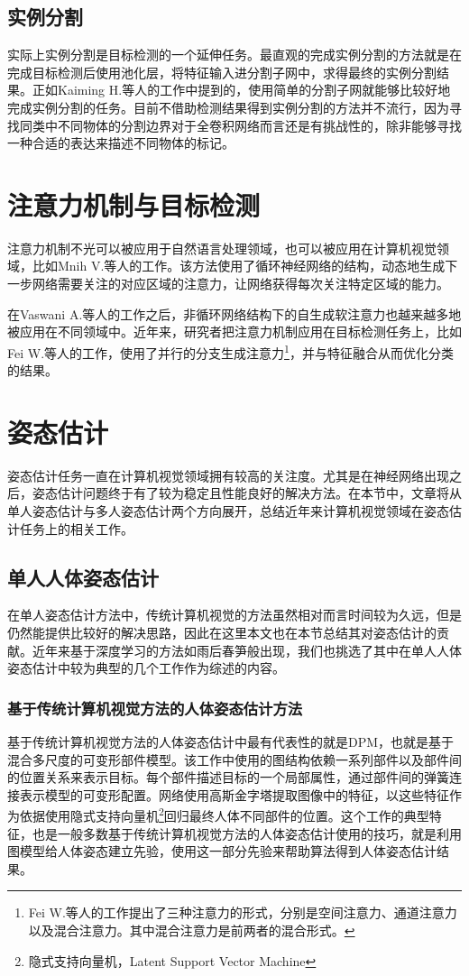 \subsection{实例分割}
\label{subsec:insseg}
实际上实例分割是目标检测的一个延伸任务。最直观的完成实例分割的方法就是在完成目标检测后使用池化层，将特征输入进分割子网中，求得最终的实例分割结果。正如Kaiming H.等人\cite{He2017Mask}的工作中提到的，使用简单的分割子网就能够比较好地完成实例分割的任务。目前不借助检测结果得到实例分割的方法并不流行，因为寻找同类中不同物体的分割边界对于全卷积网络而言还是有挑战性的，除非能够寻找一种合适的表达来描述不同物体的标记。

\section{注意力机制与目标检测}
\label{sec:attenandobjdet}
注意力机制不光可以被应用于自然语言处理领域，也可以被应用在计算机视觉领域，比如Mnih V.等人的工作\cite{mnih2014recurrent}。该方法使用了循环神经网络的结构，动态地生成下一步网络需要关注的对应区域的注意力，让网络获得每次关注特定区域的能力。

在Vaswani A.等人的工作\cite{vaswani2017attention}之后，非循环网络结构下的自生成软注意力也越来越多地被应用在不同领域中。近年来，研究者把注意力机制应用在目标检测任务上，比如Fei W.等人的工作\cite{wang2017residual}，使用了并行的分支生成注意力\footnote{Fei W.等人的工作提出了三种注意力的形式，分别是空间注意力、通道注意力以及混合注意力。其中混合注意力是前两者的混合形式。}，并与特征融合从而优化分类的结果。

\section{姿态估计}
\label{sec:poseestimation}
姿态估计任务一直在计算机视觉领域拥有较高的关注度。尤其是在神经网络出现之后，姿态估计问题终于有了较为稳定且性能良好的解决方法。在本节中，文章将从单人姿态估计与多人姿态估计两个方向展开，总结近年来计算机视觉领域在姿态估计任务上的相关工作。
\subsection{单人人体姿态估计}
\label{subsec:singlepose}
在单人姿态估计方法中，传统计算机视觉的方法虽然相对而言时间较为久远，但是仍然能提供比较好的解决思路，因此在这里本文也在本节总结其对姿态估计的贡献。近年来基于深度学习的方法如雨后春笋般出现，我们也挑选了其中在单人人体姿态估计中较为典型的几个工作作为综述的内容。
\subsubsection{基于传统计算机视觉方法的人体姿态估计方法}
\label{subsubsec:legacypose}
基于传统计算机视觉方法的人体姿态估计中最有代表性的就是DPM\cite{felzenszwalb2010object}，也就是基于混合多尺度的可变形部件模型。该工作中使用的图结构依赖一系列部件以及部件间的位置关系来表示目标。每个部件描述目标的一个局部属性，通过部件间的弹簧连接表示模型的可变形配置。网络使用高斯金字塔提取图像中的特征，以这些特征作为依据使用隐式支持向量机\footnote{隐式支持向量机，Latent Support Vector Machine}回归最终人体不同部件的位置。这个工作的典型特征，也是一般多数基于传统计算机视觉方法的人体姿态估计使用的技巧，就是利用图模型给人体姿态建立先验，使用这一部分先验来帮助算法得到人体姿态估计结果。
